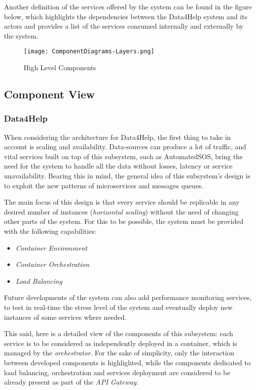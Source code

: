 Another definition of the services offered by the system can be found in the figure below, which highlights the dependencies between the Data4Help system and its actors and provides a list of the services consumed internally and externally by the system.

\FloatBarrier
\begin{figure}[!h]
	\centering
	\texttt{[image: ComponentDiagrams-Layers.png]}
	\caption{High Level Components}
\end{figure}
\FloatBarrier

\newpage
\subsection{Component View}


\subsubsection{Data4Help}

When considering the architecture for Data4Help, the first thing to take in account is scaling and availability. Data-sources can produce a lot of traffic, and vital services built on top of this subsystem, such as AutomatedSOS, bring the need for the system to handle all the data without losses, latency or service unavailability.
Bearing this in mind, the general idea of this subsystem's design is to exploit the new patterns of microservices and messages queues. 

The main focus of this design is that every service should be replicable in any desired number of instances (\textit{horizontal scaling}) without the need of changing other parts of the system. For this to be possible, the system must be provided with the following capabilities:

\begin{itemize}
	\item \textit{Container Environment}
	\item \textit{Container Orchestration}
	\item \textit{Load Balancing}
\end{itemize}

Future developments of the system can also add performance monitoring services, to test in real-time the stress level of the system and eventually deploy new instances of some services where needed.

This said, here is a detailed view of the components of this subsystem: each service is to be considered as independently deployed in a container, which is managed by the \textit{orchestrator}. For the sake of simplicity, only the interaction between developed components is highlighted, while the components dedicated to load balancing, orchestration and services deployment are considered to be already present as part of the \textit{API Gateway}.



